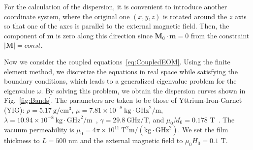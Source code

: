 \documentclass[aps,prb,10pt,amsmath,amssymb,twocolumn,longbibliography,superscriptaddress]{revtex4-2}
\begin{document}
For the calculation of the dispersion, it is convenient to introduce another coordinate system, where the original one $(x,y,z)$ is rotated around the $z$ axis so that one of the axes is parallel to the external magnetic field. Then, the component of $\bm{m}$ is zero along this direction since $\bm{M}_0\cdot\bm{m}=0$ from the constraint $|\bm{M}|=const.$

Now we consider the coupled equations~\eqref{eq:CoupledEOM}. Using the finite element method, we discretize the equations in real space while satisfying the boundary conditions, which leads to a generalized eigenvalue problem for the eigenvalue $\omega$. By solving this problem, we obtain the dispersion curves shown in Fig.~\ref{fig:Bands}. The parameters are taken to be those of Yttrium-Iron-Garnet (YIG): $\rho=5.17\ \mathrm{g}/\mathrm{cm}^3$, $\mu=7.81\times10^{-8}\ \mathrm{kg}\cdot\mathrm{GHz}^2/\mathrm{m}$, $\lambda=10.94\times10^{-8}\ \mathrm{kg}\cdot\mathrm{GHz}^2/\mathrm{m}$~\cite{clarkElasticConstantsSingleCrystal1961}, $\gamma=29.8\ \mathrm{GHz}/\mathrm{T}$, and $\mu_0M_0=0.178$ T~\cite{AulockHandbookofferritematerials}. The vacuum permeability is $\mu_0=4\pi\times10^{11}\ \mathrm{T}^2\mathrm{m}/(\mathrm{kg}\cdot\mathrm{GHz}^2)$. We set the film thickness to $L=500$ nm and the external magnetic field to $\mu_0H_0=0.1$ T.
\end{document}
